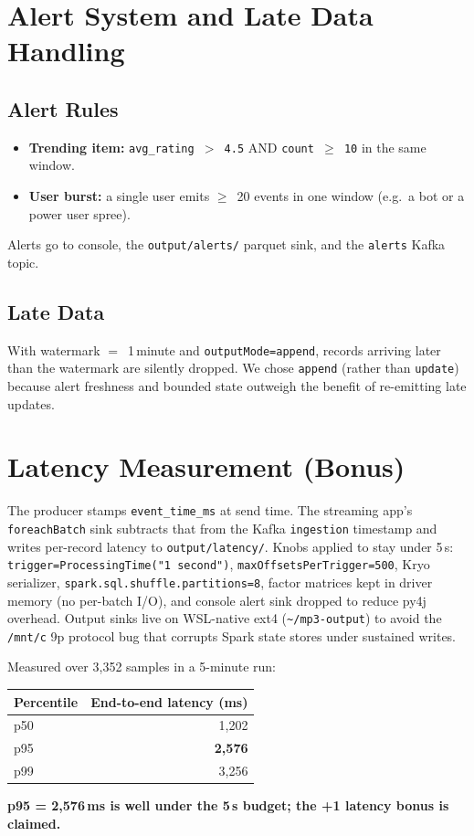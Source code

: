 \documentclass[11pt,a4paper]{article}
\begin{document}
\section{Alert System and Late Data Handling}
\subsection{Alert Rules}
\begin{itemize}[noitemsep]
  \item \textbf{Trending item:} \texttt{avg\_rating $>$ 4.5} AND
        \texttt{count $\geq$ 10} in the same window.
  \item \textbf{User burst:} a single user emits $\geq$~20 events in one
        window (e.g.\ a bot or a power user spree).
\end{itemize}
Alerts go to console, the \texttt{output/alerts/} parquet sink, and the
\texttt{alerts} Kafka topic.

\subsection{Late Data}
With watermark $=$~1\,minute and \texttt{outputMode=append}, records arriving
later than the watermark are silently dropped. We chose \texttt{append} (rather
than \texttt{update}) because alert freshness and bounded state outweigh the
benefit of re-emitting late updates.

\section{Latency Measurement (Bonus)}
The producer stamps \texttt{event\_time\_ms} at send time. The streaming app's
\texttt{foreachBatch} sink subtracts that from the Kafka \texttt{ingestion}
timestamp and writes per-record latency to \texttt{output/latency/}. Knobs
applied to stay under 5\,s: \texttt{trigger=ProcessingTime("1 second")},
\texttt{maxOffsetsPerTrigger=500}, Kryo serializer,
\texttt{spark.sql.shuffle.partitions=8}, factor matrices kept in driver memory
(no per-batch I/O), and console alert sink dropped to reduce py4j overhead.
Output sinks live on WSL-native ext4 (\texttt{\textasciitilde/mp3-output}) to
avoid the \texttt{/mnt/c} 9p protocol bug that corrupts Spark state stores
under sustained writes.

Measured over 3{,}352 samples in a 5-minute run:
\begin{center}
\begin{tabular}{lr}
\toprule
\textbf{Percentile} & \textbf{End-to-end latency (ms)} \\
\midrule
p50 & 1{,}202 \\
p95 & \textbf{2{,}576} \\
p99 & 3{,}256 \\
\bottomrule
\end{tabular}
\end{center}
\textbf{p95 = 2{,}576\,ms is well under the 5\,s budget; the +1 latency bonus
is claimed.}
\end{document}

